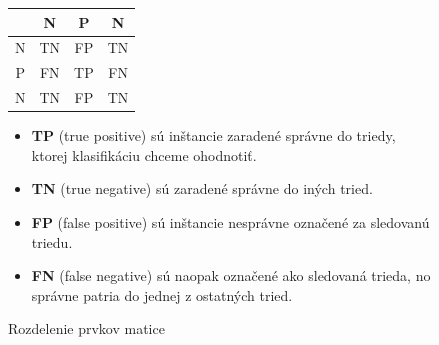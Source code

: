             \begin{figure}[!h]
                \begin{minipage}[b]{0.38\textwidth}
                    \begin{tabular}{c|c|c|c|}
                          & N  &  P & N  \\
                        \hline
                        N & TN & FP & TN \\
                        \hline
                        P & FN & TP & FN \\
                        \hline
                        N & TN & FP & TN \\
                        \hline
                    \end{tabular}
                    \centering
                    \caption{Rozdelenie prvkov matice}
                    \label{fig:example_confusion_matrix}
                \end{minipage}
                \begin{minipage}[b]{0.6\textwidth}
                    \begin{itemize}
                        \item \textbf{TP} (true positive) sú inštancie zaradené správne do triedy, ktorej klasifikáciu chceme ohodnotiť.
                        \item \textbf{TN} (true negative) sú zaradené správne do iných tried.
                        \item \textbf{FP} (false positive) sú inštancie nesprávne označené za sledovanú triedu.
                        \item \textbf{FN} (false negative) sú naopak označené ako sledovaná trieda, no správne patria do jednej z ostatných tried.
                    \end{itemize}
                \end{minipage}
            \end{figure}

